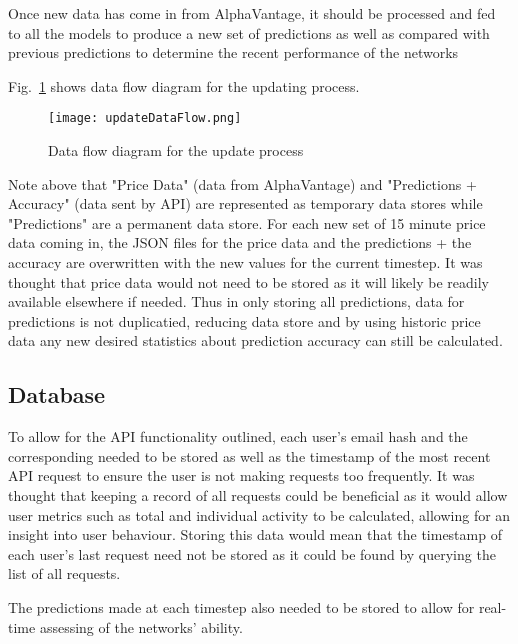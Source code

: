             Once new data has come in from AlphaVantage, it should be processed and fed to all the models to produce a new set of predictions as well as compared with previous predictions to determine the recent performance of the networks

            Fig.~\ref{fig:updateDataFlow} shows data flow diagram for the updating process.

            \begin{figure}[h]
                \centering
                \texttt{[image: updateDataFlow.png]}
                \caption{Data flow diagram for the update process}
                \label{fig:updateDataFlow}
            \end{figure}
            

        Note above that "Price Data" (data from AlphaVantage) and "Predictions + Accuracy" (data sent by API) are represented as temporary data stores while "Predictions" are a permanent data store. For each new set of 15 minute price data coming in, the JSON files for the price data and the predictions + the accuracy are overwritten with the new values for the current timestep. It was thought that price data would not need to be stored as it will likely be readily available elsewhere if needed. Thus in only storing all predictions, data for predictions is not duplicatied, reducing data store and by using historic price data any new desired statistics about prediction accuracy can still be calculated.
        
        \subsection{Database}
        To allow for the API functionality outlined, each user's email hash and the corresponding needed to be stored as well as the timestamp of the most recent API request to ensure the user is not making requests too frequently. It was thought that keeping a record of all requests could be beneficial as it would allow user metrics such as total and individual activity to be calculated, allowing for an insight into user behaviour. Storing this data would mean that the timestamp of each user's last request need not be stored as it could be found by querying the list of all requests.

        The predictions made at each timestep also needed to be stored to allow for real-time assessing of the networks' ability.
        
